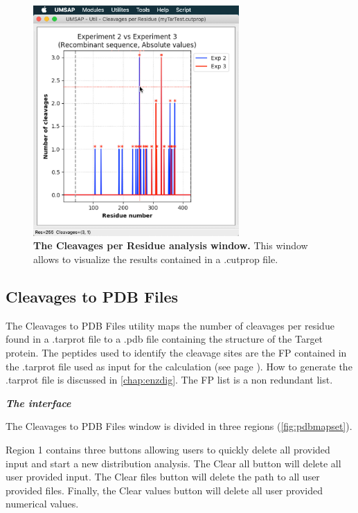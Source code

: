 \begin{figure}[h]
	\centering
	\includegraphics[width=0.7\textwidth]{./IMAGES/UTIL-CUTPROP-WINDOW/util-cutprop-res.jpg}	    
	\caption[The Cleavages per Residue analysis window]{\textbf{The Cleavages per Residue analysis window.} This window allows to visualize the results contained in a .cutprop file.} 
	\label{fig:cutpropshwo}
	\vspace{-5pt} 	
\end{figure}

\subsection{Cleavages to PDB Files}
\label{subsec:cut2pdb}

The Cleavages to PDB Files utility maps the number of cleavages per residue found in a .tarprot file to a .pdb file containing the structure of the Target protein. The peptides used to identify the cleavage sites are the FP contained in the .tarprot file used as input for the calculation (see page \pageref{par:PIP}). How to generate the .tarprot file is discussed in \autoref{chap:enzdig}. The FP list is a non redundant list.

\textit{\textbf{The interface}}

The Cleavages to PDB Files window is divided in three regions (\autoref{fig:pdbmapset}).

Region \num{1} contains three buttons allowing users to quickly delete all provided input and start a new distribution analysis. The Clear all button will delete all user provided input. The Clear files button will delete the path to all user provided files. Finally, the Clear values button will delete all user provided numerical values.

